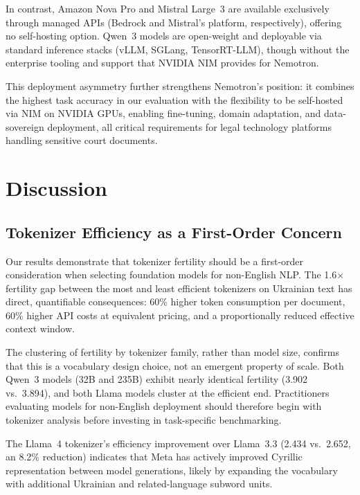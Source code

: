 \documentclass[11pt,a4paper]{article}
\begin{document}
In contrast, Amazon Nova Pro and Mistral Large~3 are available exclusively through managed APIs (Bedrock and Mistral's platform, respectively), offering no self-hosting option. Qwen~3 models are open-weight and deployable via standard inference stacks (vLLM, SGLang, TensorRT-LLM), though without the enterprise tooling and support that NVIDIA NIM provides for Nemotron.

This deployment asymmetry further strengthens Nemotron's position: it combines the highest task accuracy in our evaluation with the flexibility to be self-hosted via NIM on NVIDIA GPUs, enabling fine-tuning, domain adaptation, and data-sovereign deployment, all critical requirements for legal technology platforms handling sensitive court documents.

\section{Discussion}

\subsection{Tokenizer Efficiency as a First-Order Concern}

Our results demonstrate that tokenizer fertility should be a first-order consideration when selecting foundation models for non-English NLP. The 1.6$\times$ fertility gap between the most and least efficient tokenizers on Ukrainian text has direct, quantifiable consequences: 60\% higher token consumption per document, 60\% higher API costs at equivalent pricing, and a proportionally reduced effective context window.

The clustering of fertility by tokenizer family, rather than model size, confirms that this is a vocabulary design choice, not an emergent property of scale. Both Qwen~3 models (32B and 235B) exhibit nearly identical fertility (3.902 vs.\ 3.894), and both Llama models cluster at the efficient end. Practitioners evaluating models for non-English deployment should therefore begin with tokenizer analysis before investing in task-specific benchmarking.

The Llama~4 tokenizer's efficiency improvement over Llama~3.3 (2.434 vs.\ 2.652, an 8.2\% reduction) indicates that Meta has actively improved Cyrillic representation between model generations, likely by expanding the vocabulary with additional Ukrainian and related-language subword units.
\end{document}
